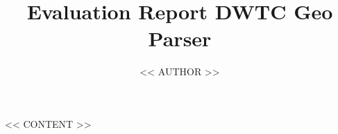 \documentclass[11pt,oneside,a4paper]{article}
\begin{document}
\title{Evaluation Report DWTC Geo Parser}
\author{<< AUTHOR >>}

\maketitle

<< CONTENT >>
\end{document}
